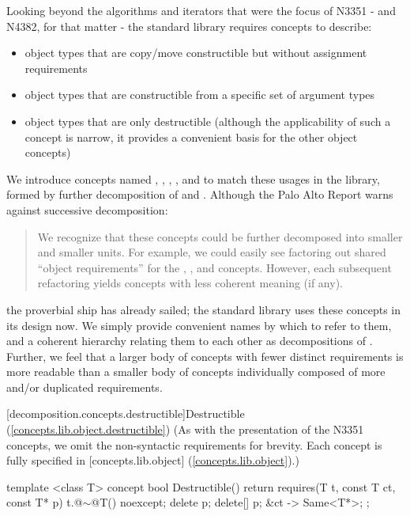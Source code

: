 Looking beyond the algorithms and iterators that were the focus of N3351 - and N4382, for that
matter - the standard library requires concepts to describe:
\begin{itemize}
\item object types that are copy/move constructible but without assignment requirements
\item object types that are constructible from a specific set of argument types
\item object types that are only destructible (although the applicability of such a concept is
narrow, it provides a convenient basis for the other object concepts)
\end{itemize}
We introduce concepts named , ,
, , and  to match these usages
in the library, formed by further decomposition of  and . Although
the Palo Alto Report warns against successive decomposition:
\begin{quote}
We recognize that these concepts could be further decomposed into smaller and smaller units.
For example, we could easily see factoring out shared ``object requirements'' for the
, , and  concepts. However, each subsequent
refactoring yields concepts with less coherent meaning (if any).
\end{quote}
the proverbial ship has already sailed; the standard library uses these concepts in its design
now. We simply provide convenient names by which to refer to them, and a coherent hierarchy
relating them to each other as decompositions of . Further, we feel that a larger
body of concepts with fewer distinct requirements is more readable than a smaller body of concepts
individually composed of more and/or duplicated requirements.

[decomposition.concepts.destructible]{Destructible (\ref{concepts.lib.object.destructible})}
(As with the presentation of the N3351 concepts, we omit the non-syntactic requirements for
brevity. Each concept is fully specified in [concepts.lib.object] (\ref{concepts.lib.object}).)

\begin{codeblock}
template <class T>
concept bool Destructible() {
  return requires(T t, const T ct, const T* p) {
    { t.@$\sim$@T() } noexcept;
    delete p;
    delete[] p;
    { &ct } -> Same<T*>;
  };
}
\end{codeblock}

